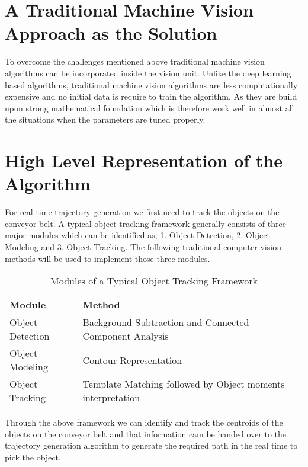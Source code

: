 \documentclass[a4paper,12pt]{book}%
\begin{document}
\section{A Traditional Machine Vision Approach as the Solution}

To overcome the challenges mentioned above traditional machine vision algorithms can be incorporated inside the vision unit. Unlike the deep learning based algorithms, traditional machine vision algorithms  are less computationally expensive and no initial data is require to train the algorithm. As they are build upon strong mathematical foundation which is therefore work well in almost all the situations when the parameters are tuned properly.

\section{High Level Representation of the Algorithm}

For real time trajectory generation we first need to track the objects on the conveyor belt. A typical object tracking framework generally consists of three major modules which can be identified as, 1. Object Detection, 2. Object Modeling and 3. Object Tracking. The following traditional computer vision methods will be used to implement those three modules.\\

\begin{table}[!h]
	\centering
	\begin{tabular}[!h]{|l | l|}
		\hline
		\textbf{Module} & \textbf{Method}\\
		\hline
		Object Detection &  Background Subtraction and Connected Component Analysis\\
		Object Modeling & Contour Representation\\
		Object Tracking & Template Matching followed by Object moments interpretation\\ 
		\hline\hline
	\end{tabular}
\caption{Modules of a Typical Object Tracking Framework}
\end{table}
	
%
%

Through the above framework we can identify and track the centroids of the objects on the conveyor belt and that information cam be handed over to the trajectory generation algorithm to generate the required path in the real time  to pick the object.
%
%

\end{document}

